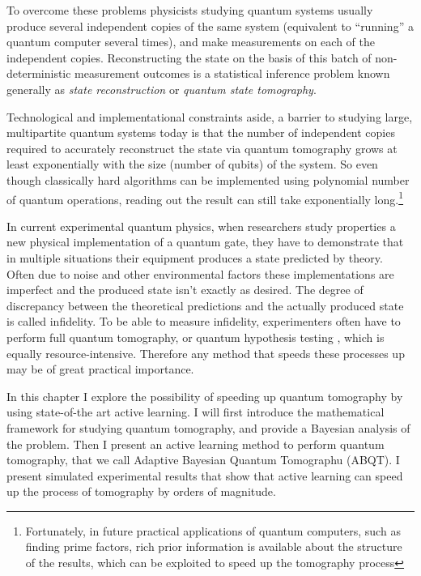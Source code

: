 To overcome these problems physicists studying quantum systems usually produce several independent copies of the same system (equivalent to ``running'' a quantum computer several times), and make measurements on each of the independent copies. Reconstructing the state on the basis of this batch of non-deterministic measurement outcomes is a statistical inference problem known generally as \emph{state reconstruction} or \emph{quantum state tomography}.

Technological and implementational constraints aside, a barrier to studying large, multipartite quantum systems today is that the number of independent copies required to accurately reconstruct the state via quantum tomography grows at least exponentially with the size (number of qubits) of the system. So even though classically hard algorithms can be implemented using polynomial number of quantum operations, reading out the result can still take exponentially long.\footnote{Fortunately, in future practical applications of quantum computers, such as finding prime factors, rich prior information is available about the structure of the results, which can be exploited to speed up the tomography process}

In current experimental quantum physics, when researchers study properties a new physical implementation of a quantum gate, they have to demonstrate that in multiple situations their equipment produces a state predicted by theory. Often due to noise and other environmental factors these implementations are imperfect and the produced state isn't exactly as desired. The degree of discrepancy between the theoretical predictions and the actually produced state is called infidelity. To be able to measure infidelity, experimenters often have to perform full quantum tomography, or quantum hypothesis testing \citep{quantumhypothesis}, which is equally resource-intensive. Therefore any method that speeds these processes up may be of great practical importance.

In this chapter I explore the possibility of speeding up quantum tomography by using state-of-the art active learning. I will first introduce the mathematical framework for studying quantum tomography, and provide a Bayesian analysis of the problem. Then I present an active learning method to perform quantum tomography, that we call Adaptive Bayesian Quantum Tomographu (ABQT). I present simulated experimental results that show that active learning can speed up the process of tomography by orders of magnitude.

